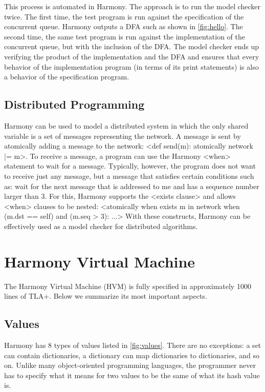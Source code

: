 \documentclass[twocolumn]{article}
\begin{document}
This process is automated in Harmony.  The approach is to
run the model checker twice.  The first time, the test program is
run against the specification of the concurrent queue.  Harmony
outputs a DFA such as shown in \autoref{fig:hello}.  The second
time, the same test program is run against the implementation of the
concurrent queue, but with the inclusion of the DFA.  The model
checker ends up verifying the product of the implementation
and the DFA and ensures that every behavior of the implementation
program (in terms of its print statements) is also a behavior of
the specification program.

\subsection{Distributed Programming}

Harmony can be used to model a distributed system in which the
only shared variable is a set of messages representing the network.
A message is sent by atomically adding a message to the network:
<{def send(m): atomically network |= {m}}>.
To receive a message, a program can use the Harmony <{when}>
statement to wait for a message.  Typically, however, the program
does not want to receive just any message, but a message that satisfies
certain conditions such as: wait for the next message that is addressed
to me and has a sequence number larger than 3.
For this, Harmony supports the <{exists clause}> and allows
<{when}> clauses to be nested:
<{atomically when exists m in network when (m.dst == self) and (m.seq > 3): ...}>
With these constructs, Harmony can be effectively used as a
model checker for distributed algorithms.

\section{Harmony Virtual Machine}

The Harmony Virtual Machine (HVM) is fully specified in approximately
1000 lines of TLA+.
Below we summarize its most important aspects.

\subsection{Values}

Harmony has 8 types of values listed in \autoref{fig:values}.
There are no exceptions: a set can contain dictionaries, a dictionary
can map dictionaries to dictionaries, and so on.  Unlike many
object-oriented programming languages, the programmer never
has to specify what it means for two values to be the same of what its
hash value is.
\end{document}
